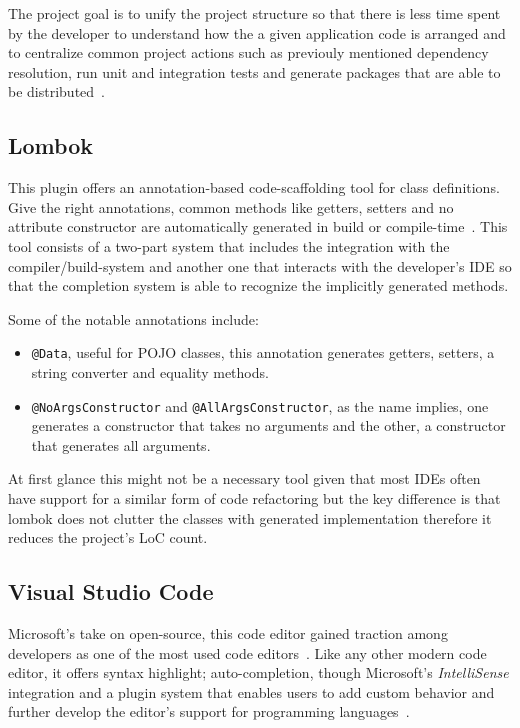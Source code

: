 The project goal is to unify the project structure so that there is less time spent by the developer to understand how the a given application code is arranged and to centralize common project actions such as previouly mentioned dependency resolution, run unit and integration tests and generate packages that are able to be distributed~\cite{mavenintro}.

\subsection{Lombok}\label{tech:lombok}
This plugin offers an annotation-based code-scaffolding tool for class definitions. Give the right annotations, common methods like getters, setters and no attribute constructor are automatically generated in build or compile-time~\cite{lombok}. This tool consists of a two-part system that includes the integration with the compiler/build-system and another one that interacts with the developer's \gls{IDE} so that the completion system is able to recognize the implicitly generated methods.

Some of the notable annotations include:
\begin{itemize}
\item \texttt{@Data}, useful for \gls{POJO} classes, this annotation generates getters, setters, a string converter and equality methods.
\item \texttt{@NoArgsConstructor} and \texttt{@AllArgsConstructor}, as the name implies, one generates a constructor that takes no arguments and the other, a constructor that generates all arguments.
\end{itemize}

At first glance this might not be a necessary tool given that most \gls{IDE}s often have support for a similar form of code refactoring but the key difference is that lombok does not clutter the classes with generated implementation therefore it reduces the project's \gls{LoC} count.

\subsection{Visual Studio Code}
Microsoft's take on open-source, this code editor gained traction among developers as one of the most used code editors~\cite{vscodesurvey}. Like any other modern code editor, it offers syntax highlight; auto-completion, though Microsoft's \textit{IntelliSense} integration and a plugin system that enables users to add custom behavior and further develop the editor's support for programming languages~\cite{vscode}.

